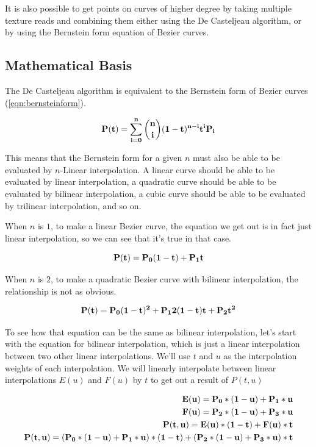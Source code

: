 \documentclass{jcgt}
\begin{document}
It is also possible to get points on curves of higher degree by taking multiple texture reads and combining them either using the De Casteljeau algorithm, or by using the Bernstein form equation of Bezier curves.

\subsection{Mathematical Basis}

The De Casteljeau algorithm is equivalent to the Bernstein form of Bezier curves (\autoref{eqn:bernsteinform}).

\begin{equation}
\bf{P(t)} = \sum\limits_{i=0}^n\binom {n} {i}(1-t)^{n-i}t^i\text{\bf{P}}_i
\label{eqn:bernsteinform}
\end{equation}

This means that the Bernstein form for a given $n$ must also be able to be evaluated by $n$-Linear interpolation.  A linear curve should be able to be evaluated by linear interpolation, a quadratic curve should be able to be evaluated by bilinear interpolation, a cubic curve should be able to be evaluated by trilinear interpolation, and so on.

When $n$ is $1$, to make a linear Bezier curve, the equation we get out is in fact just linear interpolation, so we can see that it's true in that case.

\begin{equation}
\bf{P(t)} = P_0(1-t) + P_1t
\label{eqn:bernsteinformn1}
\end{equation}

When $n$ is $2$, to make a quadratic Bezier curve with bilinear interpolation, the relationship is not as obvious.

\begin{equation}
\bf{P(t)} = P_0(1-t)^2 + P_12(1-t)t + P_2t^2
\label{eqn:bernsteinformn2}
\end{equation}

To see how that equation can be the same as bilinear interpolation, let's start with the equation for bilinear interpolation, which is just a linear interpolation between two other linear interpolations.  We'll use $t$ and $u$ as the interpolation weights of each interpolation.  We will linearly interpolate between linear interpolations $E(u)$ and $F(u)$ by $t$ to get out a result of $P(t,u)$

\begin{equation}
\begin{split}
\bf{E(u)} = P_0*(1-u) + P_1*u \\
\bf{F(u)} = P_2*(1-u) + P_3*u \\
\bf{P(t,u)} = E(u)*(1-t) + F(u)*t \\
\bf{P(t,u)} = (P_0*(1-u) + P_1*u)*(1-t) + (P_2*(1-u) + P_3*u)*t
\end{split}
\label{eqn:bilinearinterpolation}
\end{equation}
\end{document}

